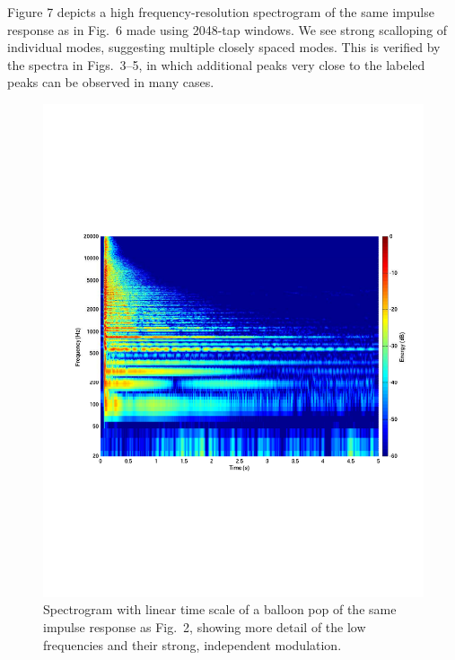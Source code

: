 \documentclass{aes137}
\begin{document}
Figure 7 depicts a high frequency-resolution spectrogram of the same
impulse response as in Fig.~6 made using 2048-tap windows. We see strong scalloping of
individual modes, suggesting multiple closely spaced modes. This is
verified by the spectra in Figs.~3--5, in which additional peaks very
close to the labeled peaks can be observed in many cases.

%

\begin{figure}[h!] \centering \includegraphics[width=\linewidth]{images/P14IR_sgm_cropped.pdf} \caption{Spectrogram with linear time scale of a balloon pop of the same impulse response as Fig.~2, showing more detail of the low frequencies and their strong, independent modulation.} \end{figure}
\end{document}
